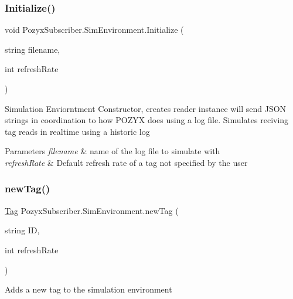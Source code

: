 \subsubsection{\texorpdfstring{Initialize()}{Initialize()}\hspace{0.1cm}{\footnotesize\ttfamily [2/2]}}
{\footnotesize\ttfamily void Pozyx\+Subscriber.\+Sim\+Environment.\+Initialize (\begin{DoxyParamCaption}\item[{string}]{filename,  }\item[{int}]{refresh\+Rate }\end{DoxyParamCaption})}



Simulation Enviorntment Constructor, creates reader instance will send J\+S\+ON strings in coordination to how P\+O\+Z\+YX does using a log file. Simulates reciving tag reads in realtime using a historic log 


\begin{DoxyParams}{Parameters}
{\em filename} & name of the log file to simulate with\\
\hline
{\em refresh\+Rate} & Default refresh rate of a tag not specified by the user\\
\hline
\end{DoxyParams}
\mbox{\label{class_pozyx_subscriber_1_1_sim_environment_af4ddb163b4b711c2c1105c7fc0253af9}} 
\subsubsection{\texorpdfstring{new\+Tag()}{newTag()}}
{\footnotesize\ttfamily \hyperlink{class_pozyx_subscriber_1_1_framework_1_1_tag}{Tag} Pozyx\+Subscriber.\+Sim\+Environment.\+new\+Tag (\begin{DoxyParamCaption}\item[{string}]{ID,  }\item[{int}]{refresh\+Rate }\end{DoxyParamCaption})}



Adds a new tag to the simulation environment 


